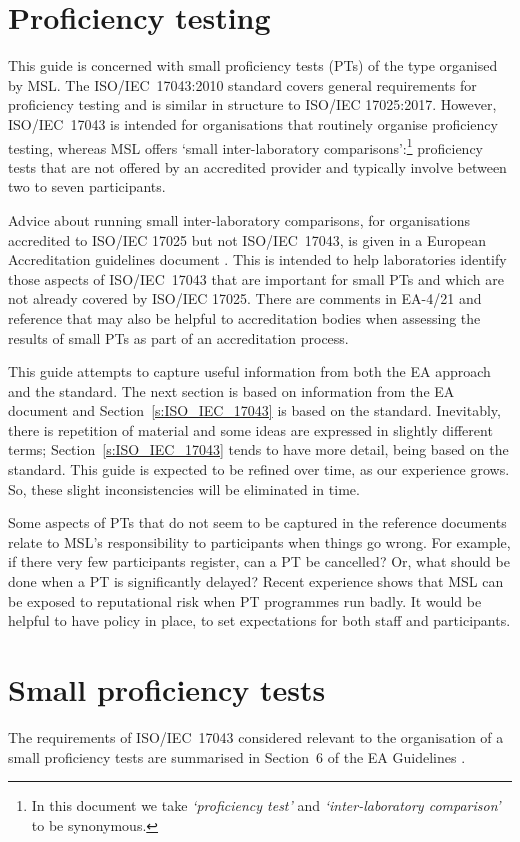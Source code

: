 \section{Proficiency testing}
This guide is concerned with small proficiency tests (PTs) of the type organised by MSL. The ISO/IEC~17043:2010 standard covers general requirements for proficiency testing and is similar in structure to ISO/IEC 17025:2017. However, ISO/IEC~17043 is intended for organisations that routinely organise proficiency testing, whereas MSL offers `small inter-laboratory comparisons':\footnote{In this document we take \textit{`proficiency test'} and \textit{`inter-laboratory comparison'} to be synonymous.} proficiency tests that are not offered by an accredited provider and typically involve between two to seven participants. 

Advice about running small inter-laboratory comparisons, for organisations accredited to ISO/IEC 17025 but not ISO/IEC~17043, is given in a European Accreditation guidelines document \cite{EA-4/21}. This is intended to help laboratories identify those aspects of ISO/IEC~17043 that are important for small PTs and which are not already covered by ISO/IEC 17025. There are comments in EA-4/21 and reference \cite{Milde:2020} that may also be helpful to accreditation bodies when assessing the results of small PTs as part of an accreditation process.

This guide attempts to capture useful information from both the EA approach and the standard. The next section is based on information from the EA document and Section~\ref{s:ISO_IEC_17043} is based on the standard. Inevitably, there is repetition of material and some ideas are expressed in slightly different terms; Section~\ref{s:ISO_IEC_17043} tends to have more detail, being based on the standard. This guide is expected to be refined over time, as our experience grows. So, these slight inconsistencies will be eliminated in time. 

Some aspects of PTs that do not seem to be captured in the reference documents relate to MSL's responsibility to participants when things go wrong. For example, if there very few participants register, can a PT be cancelled? Or, what should be done when a PT is significantly delayed? Recent experience shows that MSL can be exposed to reputational risk when PT programmes run badly. It would be helpful to have policy in place, to set expectations for both staff and participants.

\section{Small proficiency tests}
The requirements of ISO/IEC~17043 considered relevant to the organisation of a small proficiency tests are summarised in Section~6 of the EA Guidelines \cite{EA-4/21}.

